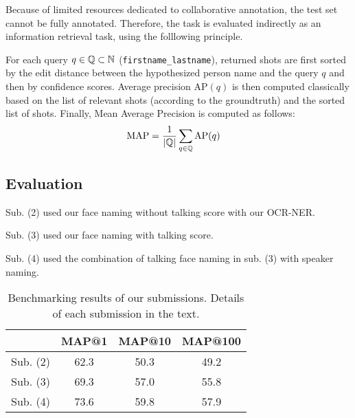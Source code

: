 Because of limited resources dedicated to collaborative annotation, the test set cannot be fully annotated. Therefore, the task is evaluated indirectly as an information retrieval task, using the folllowing principle.

For each query $q \in \mathbb{Q} \subset \mathbb{N}$ (\texttt{first\-name\_lastname}), returned shots are first sorted by the edit distance between the hypothesized person name and the query $q$ and then by confidence scores.
Average precision $\text{AP}(q)$ is then computed classically based on the list of relevant shots (according to the groundtruth) and the sorted list of shots. Finally, Mean Average Precision is computed as follows:
\begin{align}
            \text{MAP} & = \frac{1}{|\mathbb{Q}|} \sum_{q \in \mathbb{Q}} \text{AP}(q) \nonumber
\end{align}

\subsection{Evaluation}

\begin{compactitem}
	\item Sub. (2) used our face naming without talking score with our OCR-NER.
	\item Sub. (3) used our face naming with talking score. 
	\item Sub. (4) used the combination of talking face naming in sub. (3) with speaker naming.
\end{compactitem}

\begin{table}[tb]
\centering
\begin{tabular}{c|c|c|c|}
\cline{2-4}
                                & MAP@1  & MAP@10 & MAP@100  \\ \hline

 \multicolumn{1}{|c|}{Sub. (2)} & 62.3   & 50.3   & 49.2 \\ \hline
 \multicolumn{1}{|c|}{Sub. (3)} & 69.3   & 57.0   & 55.8 \\ \hline
 \multicolumn{1}{|c|}{Sub. (4)} & 73.6   & 59.8   & 57.9 \\ \hline

\end{tabular}
\vspace*{-2mm}
\caption{Benchmarking results of our submissions. Details of each submission in the text.}
\vspace*{-2mm}
\label{tab:mediaeval}
\end{table}


